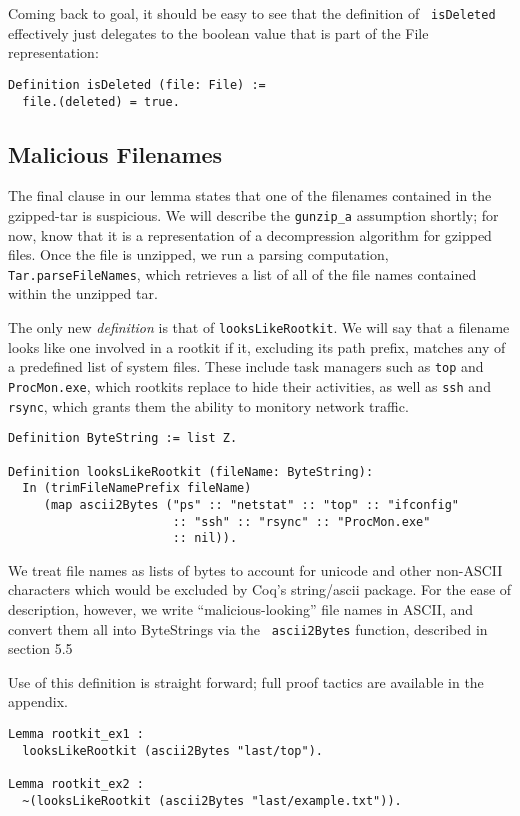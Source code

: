 \documentclass[nocopyrightspace]{sigplanconf}
\begin{document}
Coming back to goal, it should be easy to see that the definition of {\tt
isDeleted} effectively just delegates to the boolean value that is part of the
File representation:

\begin{lstlisting}
Definition isDeleted (file: File) :=
  file.(deleted) = true.
\end{lstlisting}

\subsection{Malicious Filenames}

The final clause in our lemma states that one of the filenames contained in
the gzipped-tar is suspicious. We will describe the {\tt gunzip\_a} assumption
shortly; for now, know that it is a representation of a decompression
algorithm for gzipped files. Once the file is unzipped, we run a parsing
computation, {\tt Tar.parseFileNames}, which retrieves a list of all of the
file names contained within the unzipped tar.

The only new {\it definition} is that of {\tt looksLikeRootkit}. We will say
that a filename looks like one involved in a rootkit if it, excluding its path
prefix, matches any of a predefined list of system files. These include task
managers such as {\tt top} and {\tt ProcMon.exe}, which rootkits replace to
hide their activities, as well as {\tt ssh} and {\tt rsync}, which grants them
the ability to monitory network traffic.

\begin{lstlisting}
Definition ByteString := list Z.

Definition looksLikeRootkit (fileName: ByteString):
  In (trimFileNamePrefix fileName) 
     (map ascii2Bytes ("ps" :: "netstat" :: "top" :: "ifconfig" 
                       :: "ssh" :: "rsync" :: "ProcMon.exe" 
                       :: nil)).
\end{lstlisting}

We treat file names as lists of bytes to account for unicode and other
non-ASCII characters which would be excluded by Coq's string/ascii package.
For the ease of description, however, we write ``malicious-looking'' file
names in ASCII, and convert them all into ByteStrings via the {\tt
ascii2Bytes} function, described in section 5.5

Use of this definition is straight forward; full proof tactics are available
in the appendix.

\begin{lstlisting}
Lemma rootkit_ex1 : 
  looksLikeRootkit (ascii2Bytes "last/top").

Lemma rootkit_ex2 : 
  ~(looksLikeRootkit (ascii2Bytes "last/example.txt")).
\end{lstlisting}
\end{document}
